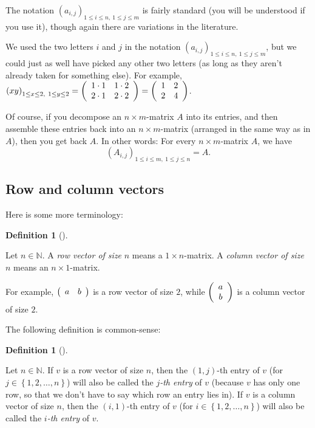 \documentclass[numbers=enddot,12pt,final,onecolumn,notitlepage]{scrartcl}%
\theoremstyle{definition}
\newtheorem{defi}[theo]{Definition}
\newenvironment{definition}[1][]
{\begin{defi}[#1]\begin{leftbar}}
{\end{leftbar}\end{defi}}
\begin{document}
The notation $\left(  a_{i,j}\right)  _{1\leq i\leq n,\ 1\leq j\leq m}$ is
fairly standard (you will be understood if you use it), though again there are
variations in the literature.

We used the two letters $i$ and $j$ in the notation $\left(  a_{i,j}\right)
_{1\leq i\leq n,\ 1\leq j\leq m}$, but we could just as well have picked any
other two letters (as long as they aren't already taken for something else).
For example, $\left(  xy\right)  _{1\leq x\leq2,\ 1\leq y\leq2}=\left(
\begin{array}
[c]{cc}%
1\cdot1 & 1\cdot2\\
2\cdot1 & 2\cdot2
\end{array}
\right)  =\left(
\begin{array}
[c]{cc}%
1 & 2\\
2 & 4
\end{array}
\right)  $.

Of course, if you decompose an $n\times m$-matrix $A$ into its entries, and
then assemble these entries back into an $n\times m$-matrix (arranged in the
same way as in $A$), then you get back $A$. In other words: For every $n\times
m$-matrix $A$, we have%
\begin{equation}
\left(  A_{i,j}\right)  _{1\leq i\leq m,\ 1\leq j\leq n}=A.
\label{eq.matrix.A-through-Aij}%
\end{equation}


\subsection{Row and column vectors}

Here is some more terminology:

\begin{definition}
Let $n\in\mathbb{N}$. A \textit{row vector of size }$n$ means a $1\times
n$-matrix. A \textit{column vector of size }$n$ means an $n\times1$-matrix.
\end{definition}

For example, $\left(
\begin{array}
[c]{cc}%
a & b
\end{array}
\right)  $ is a row vector of size $2$, while $\left(
\begin{array}
[c]{c}%
a\\
b
\end{array}
\right)  $ is a column vector of size $2$.

The following definition is common-sense:

\begin{definition}
Let $n\in\mathbb{N}$. If $v$ is a row vector of size $n$, then the $\left(
1,j\right)  $-th entry of $v$ (for $j\in\left\{  1,2,\ldots,n\right\}  $) will
also be called the $j$\textit{-th entry} of $v$ (because $v$ has only one row,
so that we don't have to say which row an entry lies in). If $v$ is a column
vector of size $n$, then the $\left(  i,1\right)  $-th entry of $v$ (for
$i\in\left\{  1,2,\ldots,n\right\}  $) will also be called the $i$\textit{-th
entry} of $v$.
\end{definition}
\end{document}
